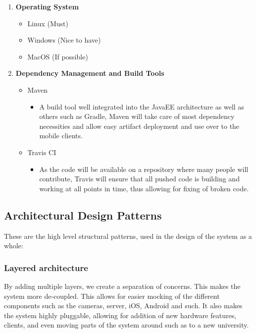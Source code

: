 \documentclass{article}
\begin{document}
\begin{enumerate}
\begin{itemize}
\begin{itemize}
					\end{itemize}
				\end{itemize}
				\item \textbf{Operating System}
				\begin{itemize}
					\item Linux (Must)
					\item Windows (Nice to have)
					\item MacOS (If possible)
				\end{itemize}
				\item \textbf{Dependency Management and Build Tools}
				\begin{itemize}
					\item Maven
					\begin{itemize}
						\item A build tool well integrated into the JavaEE architecture as well as others such as Gradle, Maven will take care of most dependency necessities and allow easy artifact deployment and use over to the mobile clients. 
					\end{itemize}
					\item Travis CI
					\begin{itemize}
						\item As the code will be available on a repository where many people will contribute, Travis will ensure that all pushed code is building and working at all points in time, thus allowing for fixing of broken code.
					\end{itemize}
				\end{itemize}
			\end{enumerate}
	
		\pagebreak
		
		\subsection{Architectural Design Patterns}
		
		These are the high level structural patterns, used in the design of the system as a whole:
		
			\subsubsection{Layered architecture}
			
			By adding multiple layers, we create a separation of concerns. This makes the system more de-coupled. This allows for easier mocking of the different components such as  the cameras, server, iOS, Android and such. It also makes the system highly pluggable, allowing for addition of new hardware features, clients, and even moving parts of the system around such as to a new university.
			
\end{document}
